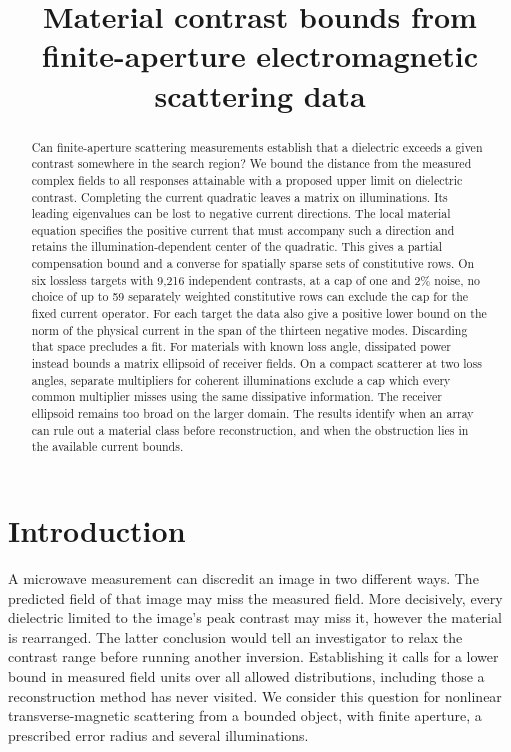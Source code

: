 \documentclass[anonymous,12pt]{iopjournal}
\numberwithin{equation}{section}
\begin{document}
\par\vspace{1.8ex}
\title{Material contrast bounds from finite-aperture electromagnetic scattering data}
\author{}
\begin{abstract}
Can finite-aperture scattering measurements establish that a dielectric exceeds a given contrast somewhere in the search region? We bound the distance from the measured complex fields to all responses attainable with a proposed upper limit on dielectric contrast. Completing the current quadratic leaves a matrix on illuminations. Its leading eigenvalues can be lost to negative current directions. The local material equation specifies the positive current that must accompany such a direction and retains the illumination-dependent center of the quadratic. This gives a partial compensation bound and a converse for spatially sparse sets of constitutive rows. On six lossless targets with 9,216 independent contrasts, at a cap of one and 2\% noise, no choice of up to 59 separately weighted constitutive rows can exclude the cap for the fixed current operator. For each target the data also give a positive lower bound on the norm of the physical current in the span of the thirteen negative modes. Discarding that space precludes a fit. For materials with known loss angle, dissipated power instead bounds a matrix ellipsoid of receiver fields. On a compact scatterer at two loss angles, separate multipliers for coherent illuminations exclude a cap which every common multiplier misses using the same dissipative information. The receiver ellipsoid remains too broad on the larger domain. The results identify when an array can rule out a material class before reconstruction, and when the obstruction lies in the available current bounds.
\end{abstract}

\section{Introduction}

A microwave measurement can discredit an image in two different ways. The predicted field of that image may miss the measured field. More decisively, every dielectric limited to the image's peak contrast may miss it, however the material is rearranged. The latter conclusion would tell an investigator to relax the contrast range before running another inversion. Establishing it calls for a lower bound in measured field units over all allowed distributions, including those a reconstruction method has never visited. We consider this question for nonlinear transverse-magnetic scattering from a bounded object, with finite aperture, a prescribed error radius and several illuminations.
\end{document}
